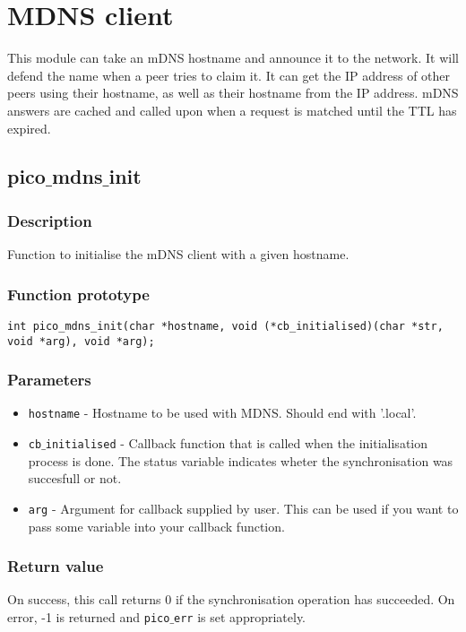 \section{MDNS client}

This module can take an mDNS hostname and announce it to the network. It will defend the name when
a peer tries to claim it. It can get the IP address of other peers using their hostname, as well as their hostname from the IP address.
mDNS answers are cached and called upon when a request is matched until the TTL has expired.

\subsection{pico$\_$mdns$\_$init}

\subsubsection*{Description}
Function to initialise the mDNS client with a given hostname.
\subsubsection*{Function prototype}
\begin{verbatim}
int pico_mdns_init(char *hostname, void (*cb_initialised)(char *str, void *arg), void *arg);
\end{verbatim}

\subsubsection*{Parameters}
\begin{itemize}[noitemsep]
\item \texttt{hostname} - Hostname to be used with MDNS. Should end with '.local'.
\item \texttt{cb$\_$initialised} - Callback function that is called when the initialisation process is done. The status variable indicates wheter the synchronisation was succesfull or not.
\item \texttt{arg} - Argument for callback supplied by user. This can be used if you want to pass some variable into your callback function.
\end{itemize}

\subsubsection*{Return value}
On success, this call returns 0 if the synchronisation operation has succeeded.
On error, -1 is returned and \texttt{pico$\_$err} is set appropriately.

